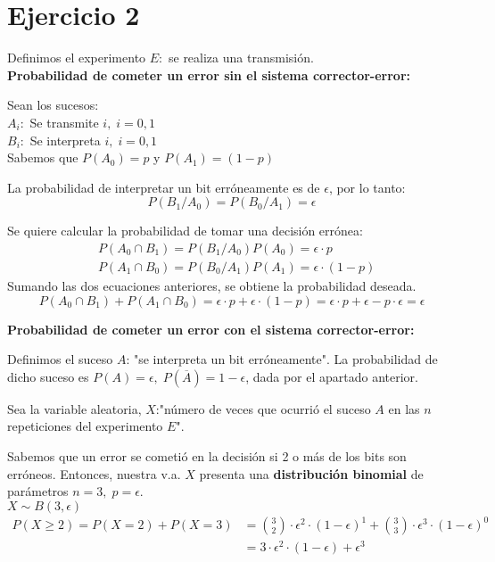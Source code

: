 \documentclass[11pt]{article}
\begin{document}
\section*{Ejercicio 2}

Definimos el experimento $E:$ se realiza una transmisión. \\

\textbf{Probabilidad de cometer un error sin el sistema corrector-error:}

Sean los sucesos: \\
$A_i:$ Se transmite $i,\;i=0,1$ \\
$B_i:$ Se interpreta $i,\;i=0,1$ \\
Sabemos que $P(A_0) = p$ y $P(A_1) = (1-p)$

La probabilidad de interpretar un bit erróneamente es de $\epsilon$, por lo tanto:
\begin{equation*}
  P(B_1/A_0) = P(B_0/A_1) = \epsilon
\end{equation*}

Se quiere calcular la probabilidad de tomar una decisión errónea:
\begin{align*}
  &P(A_0 \cap B_1) = P(B_1/A_0)P(A_0) = \epsilon \cdot p \\
  &P(A_1 \cap B_0) = P(B_0/A_1)P(A_1) = \epsilon \cdot (1-p)
\end{align*}
Sumando las dos ecuaciones anteriores, se obtiene la probabilidad deseada.
\begin{equation*}
  P(A_0 \cap B_1) + P(A_1 \cap B_0) = \epsilon \cdot p + \epsilon \cdot (1-p) =
  \epsilon \cdot p + \epsilon - p \cdot \epsilon = \epsilon
\end{equation*}


\textbf{Probabilidad de cometer un error con el sistema corrector-error:}

Definimos el suceso $A$: "se interpreta un bit erróneamente". La probabilidad de 
dicho suceso es $ P(A) = \epsilon, \; P(\overline{A}) = 1 - \epsilon $, dada
por el apartado anterior. 

Sea la variable aleatoria, $X$:"número de veces que ocurrió el suceso $A$
en las $n$ repeticiones del experimento $E$".

Sabemos que un error se cometió en la decisión si 2 o más de los bits son erróneos.
Entonces, nuestra v.a. $X$ presenta una \textbf{distribución binomial} de parámetros
$ n = 3, \; p = \epsilon $. \\
$ X \sim B(3, \epsilon) $
\begin{align*}
  P(X \geq 2) = P(X = 2) + P(X = 3) & = \binom{3}{2} \cdot  \epsilon^2 \cdot(1 - \epsilon)^1 + \binom{3}{3} \cdot \epsilon^3 \cdot (1 - \epsilon)^0 \\
                                    & = 3 \cdot \epsilon^2 \cdot (1 - \epsilon) + \epsilon^3
\end{align*}
\end{document}
